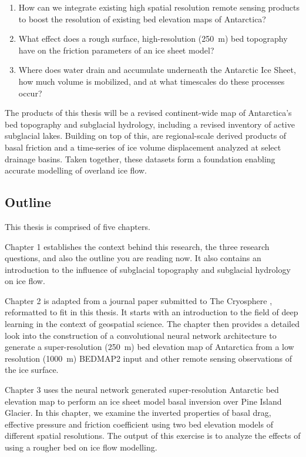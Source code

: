 \begin{enumerate}
  \item How can we integrate existing high spatial resolution remote sensing products to boost the resolution of existing bed elevation maps of Antarctica?

  \item What effect does a rough surface, high-resolution (\SI{250}{\metre}) bed topography have on the friction parameters of an ice sheet model?

  \item Where does water drain and accumulate underneath the Antarctic Ice Sheet, how much volume is mobilized, and at what timescales do these processes occur?
\end{enumerate}

The products of this thesis will be a revised continent-wide map of Antarctica's bed topography and subglacial hydrology, including a revised inventory of active subglacial lakes.
Building on top of this, are regional-scale derived products of basal friction and a time-series of ice volume displacement analyzed at select drainage basins.
Taken together, these datasets form a foundation enabling accurate modelling of overland ice flow.

\subsection{Outline}

This thesis is comprised of five chapters.

Chapter 1 establishes the context behind this research, the three research questions, and also the outline you are reading now.
It also contains an introduction to the influence of subglacial topography and subglacial hydrology on ice flow.

Chapter 2 is adapted from a journal paper submitted to The Cryosphere \citep{LeongDeepBedMapdeepneural2020}, reformatted to fit in this thesis.
It starts with an introduction to the field of deep learning in the context of geospatial science.
The chapter then provides a detailed look into the construction of a convolutional neural network architecture to generate a super-resolution (\SI{250}{\metre}) bed elevation map of Antarctica from a low resolution (\SI{1000}{\metre}) BEDMAP2 input and other remote sensing observations of the ice surface.

Chapter 3 uses the neural network generated super-resolution Antarctic bed elevation map to perform an ice sheet model basal inversion over Pine Island Glacier.
In this chapter, we examine the inverted properties of basal drag, effective pressure and friction coefficient using two bed elevation models of different spatial resolutions.
The output of this exercise is to analyze the effects of using a rougher bed on ice flow modelling.

